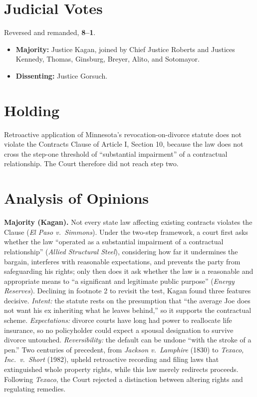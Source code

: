 \documentclass[12pt]{article}
\begin{document}
\section{Judicial Votes}

Reversed and remanded, \textbf{8--1}.
\begin{itemize}
\item \textbf{Majority:} Justice Kagan, joined by Chief Justice Roberts and Justices Kennedy, Thomas, Ginsburg, Breyer, Alito, and Sotomayor.
\item \textbf{Dissenting:} Justice Gorsuch.
\end{itemize}

\section{Holding}

Retroactive application of Minnesota's revocation-on-divorce statute does not violate the Contracts Clause of Article I, Section 10, because the law does not cross the step-one threshold of ``substantial impairment'' of a contractual relationship. The Court therefore did not reach step two.

\section{Analysis of Opinions}

\textbf{Majority (Kagan).} Not every state law affecting existing contracts violates the Clause (\textit{El Paso v.\ Simmons}). Under the two-step framework, a court first asks whether the law ``operated as a substantial impairment of a contractual relationship'' (\textit{Allied Structural Steel}), considering how far it undermines the bargain, interferes with reasonable expectations, and prevents the party from safeguarding his rights; only then does it ask whether the law is a reasonable and appropriate means to ``a significant and legitimate public purpose'' (\textit{Energy Reserves}). Declining in footnote 2 to revisit the test, Kagan found three features decisive. \emph{Intent:} the statute rests on the presumption that ``the average Joe does not want his ex inheriting what he leaves behind,'' so it supports the contractual scheme. \emph{Expectations:} divorce courts have long had power to reallocate life insurance, so no policyholder could expect a spousal designation to survive divorce untouched. \emph{Reversibility:} the default can be undone ``with the stroke of a pen.'' Two centuries of precedent, from \textit{Jackson v.\ Lamphire} (1830) to \textit{Texaco, Inc.\ v.\ Short} (1982), upheld retroactive recording and filing laws that extinguished whole property rights, while this law merely redirects proceeds. Following \textit{Texaco}, the Court rejected a distinction between altering rights and regulating remedies.
\end{document}
